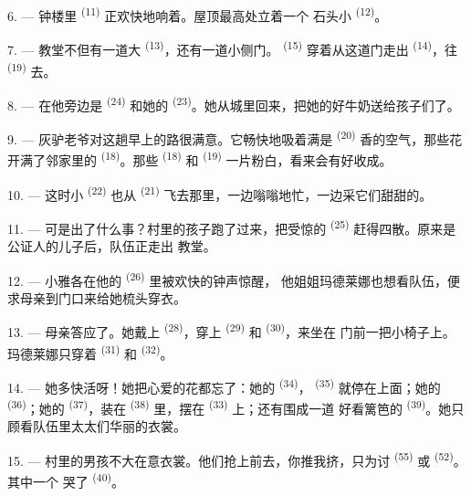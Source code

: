6. --- 钟楼里 \textsuperscript{(11)} 正欢快地响着。屋顶最高处立着一个
石头小 \textsuperscript{(12)}。

7. --- 教堂不但有一道大 \textsuperscript{(13)}，还有一道小侧门。
 \textsuperscript{(15)} 穿着从这道门走出
 \textsuperscript{(14)}，往 \textsuperscript{(19)}
去。

8. --- 在他旁边是 \textsuperscript{(24)} 和她的
 \textsuperscript{(23)}。她从城里回来，把她的好牛奶送给孩子们了。

\VUsaut{4.0mm}
\VUsaut{3.4mm}

9. --- 灰驴老爷对这趟早上的路很满意。它畅快地吸着满是
\textsuperscript{(20)} 香的空气，那些花开满了邻家里的
\textsuperscript{(18)}。那些 \textsuperscript{(18)} 和
\textsuperscript{(19)} 一片粉白，看来会有好收成。

10. --- 这时小 \textsuperscript{(22)} 也从
\textsuperscript{(21)} 飞去那里，一边嗡嗡地忙，一边采它们甜甜的。

11. --- 可是出了什么事？村里的孩子跑了过来，把受惊的
\textsuperscript{(25)} 赶得四散。原来是公证人的儿子后，队伍正走出
教堂。

12. --- 小雅各在他的 \textsuperscript{(26)} 里被欢快的钟声惊醒，
他姐姐玛德莱娜也想看队伍，便求母亲到门口来给她梳头穿衣。

13. --- 母亲答应了。她戴上 \textsuperscript{(28)}，穿上
 \textsuperscript{(29)} 和 \textsuperscript{(30)}，来坐在
门前一把小椅子上。玛德莱娜只穿着 \textsuperscript{(31)} 和
 \textsuperscript{(32)}。

14. --- 她多快活呀！她把心爱的花都忘了：她的 \textsuperscript{(34)}，
 \textsuperscript{(35)} 就停在上面；她的
\textsuperscript{(36)}；她的 \textsuperscript{(37)}，装在
\textsuperscript{(38)} 里，摆在 \textsuperscript{(33)} 上；还有围成一道
好看篱笆的 \textsuperscript{(39)}。她只顾看队伍里太太们华丽的衣裳。

15. --- 村里的男孩不大在意衣裳。他们抢上前去，你推我挤，只为讨
 \textsuperscript{(55)} 或 \textsuperscript{(52)}。其中一个
哭了 \textsuperscript{(40)}。

